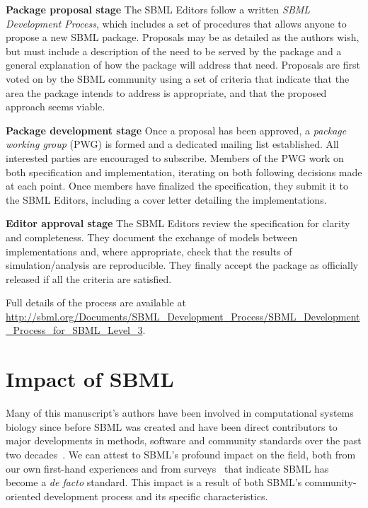 \documentclass[]{draft-sbml-paper}
\begin{document}
\textbf{Package proposal stage}\newline
The SBML Editors follow a written \emph{SBML Development Process}, which includes a set of procedures that allows anyone to propose a new SBML package.  Proposals may be as detailed as the authors wish, but must include a description of the need to be served by the package and a general explanation of how the package will address that need.  Proposals are first voted on by the SBML community using a set of criteria that indicate that the area the package intends to address is appropriate, and that the proposed approach seems viable.

\textbf{Package development stage}\newline
Once a proposal has been approved, a \emph{package working group} (PWG) is formed and a dedicated mailing list established. All interested parties are encouraged to subscribe. Members of the PWG work on both specification and implementation, iterating on both following decisions made at each point. Once members have finalized the specification, they submit it to the SBML Editors, including a cover letter detailing the implementations.

\textbf{Editor approval stage}\newline
The SBML Editors review the specification for clarity and completeness. They document the exchange of models between implementations and, where appropriate, check that the results of simulation/analysis are reproducible. They finally accept the package as officially released if all the criteria are satisfied.

Full details of the process are available at \url{http://sbml.org/Documents/SBML_Development_Process/SBML_Development_Process_for_SBML_Level_3}.

\vspace{5\baselineskip}

\hrulefill
\newpage


\section*{Impact of SBML}

Many of this manuscript's authors have been involved in computational systems biology since before SBML was created and have been direct contributors to major developments in methods, software and community standards over the past two decades~\citep{Draeger2014, Hucka2015promotinga, Brazma2006standards}.  We can attest to SBML's profound impact on the field, both from our own first-hand experiences and from surveys~\citep{Cvijovic2014bridginga, Klipp2007systems} that indicate SBML has become a \emph{de facto} standard.  This impact is a result of both SBML's community-oriented development process and its specific characteristics.
\end{document}

